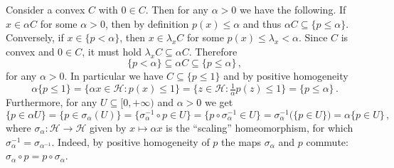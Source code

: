 \documentclass[a4paper]{article}
\newcommand{\Hcal}{\mathcal{H}}
\begin{document}
Consider a convex $C$ with $0\in C$. Then for any $\alpha > 0$ we have the following.
If $x \in \alpha C$ for some $\alpha > 0$, then by definition $p(x) \leq \alpha$ and
thus $\alpha C \subseteq \{p \leq \alpha\}$. Conversely, if $x\in \{p < \alpha\}$,
then $x \in \lambda_x C$ for some $p(x) \leq \lambda_x < \alpha$. Since $C$ is convex
and $0\in C$, it must hold $\lambda_x C \subseteq \alpha C$. Therefore
\begin{equation*}
  \{p < \alpha \}
    \subseteq \alpha C
    \subseteq \{p \leq \alpha \}
    \,,
\end{equation*}
for any $\alpha > 0$. In particular we have $C \subseteq \{p \leq 1\}$ and by positive
homogeneity
\begin{equation*}
  \alpha \{p\leq 1\}
    = \{\alpha x \in \Hcal \colon p(x) \leq 1\}
    = \bigl\{z \in \Hcal \colon \tfrac1{\alpha} p(z) \leq 1\bigr\}
    = \{p \leq \alpha\}
    \,.
\end{equation*}
Furthermore, for any $U \subseteq [0, +\infty)$ and $\alpha > 0$ we get
\begin{equation*}
  \{p \in \alpha U\}
    = \{ p \in \sigma_\alpha(U) \}
    = \{ \sigma_\alpha^{-1} \circ p \in U \}
    = \{ p \circ \sigma_\alpha^{-1} \in U \}
    = \sigma_\alpha^{-1}\bigl(\{p \in U \}\bigr)
    = \alpha \{ p\in U \}
    \,,
\end{equation*}
where $\sigma_\alpha\colon \Hcal\to \Hcal$ given by $x\mapsto \alpha x$ is the
``scaling'' homeomorphism, for which $\sigma_\alpha^{-1} = \sigma_{\alpha^{-1}}$.
Indeed, by positive homogeneity of $p$ the maps $\sigma_\alpha$ and $p$ commute:
$\sigma_\alpha \circ p = p \circ \sigma_\alpha$.
\end{document}
